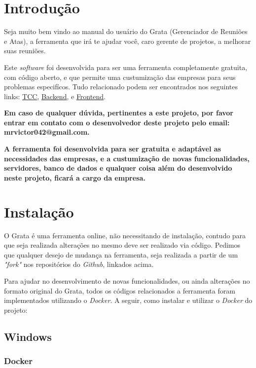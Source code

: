 \section{Introdução}
\label{sec:manual}

Seja muito bem vindo ao manual do usuário do Grata (Gerenciador de Reuniões e Atas), a ferramenta que irá te ajudar você, caro gerente de projetos, a melhorar suas reuniões.

Este \textit{software} foi desenvolvida para ser uma ferramenta completamente gratuita, com código aberto, e que permite uma custumização das empresas para seus problemas especifícos. Tudo relacionado podem ser encontrados nos seguintes links: \href{https://github.com/FGAProjects/TCC}{TCC}, \href{https://github.com/MrVictor42/Grata-Backend-v2}{Backend}, e \href{https://github.com/MrVictor42/Grata-Frontend-v2}{Frontend}. 

\textbf{Em caso de qualquer dúvida, pertinentes a este projeto, por favor entrar em contato com o desenvolvedor deste projeto pelo email: mrvictor042@gmail.com.}

\textbf{A ferramenta foi desenvolvida para ser gratuita e adaptável as necessidades das empresas, e a custumização de novas funcionalidades, servidores, banco de dados e qualquer coisa além do desenvolvido neste projeto, ficará a cargo da empresa.}

\section{Instalação}

O Grata é uma ferramenta online, não necessitando de instalação, contudo para que seja realizada alterações no mesmo deve ser realizado via código. Pedimos que qualquer desejo de mudança na ferramenta, seja realizada a partir de um \textit{"fork"} nos repositórios do \textit{Github}, linkados acima.

Para ajudar no desenvolvimento de novas funcionalidades, ou ainda alterações no formato original do Grata, todos os códigos relacionados a ferramenta foram implementados utilizando o \textit{Docker}. A seguir, como instalar e utilizar o \textit{Docker} do projeto:

\subsection{Windows}

\subsubsection{Docker}

